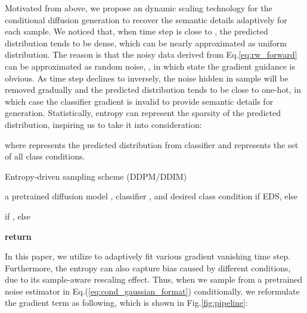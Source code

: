 \documentclass[runningheads]{llncs}
\begin{document}
Motivated from above, we propose an dynamic scaling technology for the conditional diffusion generation to recover the semantic details adaptively for each sample.
We noticed that, when time step is close to , the predicted distribution tends to be dense, which can be nearly approximated as uniform distribution.
The reason is that the noisy data derived from Eq.\eqref{eq:rw_forward} can be approximated as random noise, ,
in which state the gradient guidance is obvious.
As time step declines to  inversely, the noise hidden in sample will be removed gradually and the predicted distribution tends to be close to one-hot, in which case the classifier gradient is invalid to provide semantic details for generation.
Statistically, entropy can represent the sparsity of the predicted distribution, inspiring us to take it into consideration:

where  represents the predicted distribution from classifier and  represents the set of all class conditions.





\begin{algorithm}[t]
    \caption{ \small{Entropy-driven sampling scheme (DDPM/DDIM)}}
    \label{alg:entropy_driven_ddpm}
        
    \begin{algorithmic}[1]
        \Require a pretrained diffusion model , classifier , and desired class condition 
        \State 
        \For{}
            \State  if EDS, else 
    
                \State  if , else 
                
                \State 
                
                \State 
                \State 
                
                \State 
            \EndIf
        \EndFor
        \State \textbf{return} 
        
\end{algorithmic}
    
  
\end{algorithm}









 
In this paper, we utilize  to adaptively fit various gradient vanishing time step.
Furthermore, the entropy  can also capture bias caused by different conditions, due to its sample-aware rescaling effect.
Thus, when we sample from a pretrained noise estimator  in Eq.(\eqref{eq:cond_gaussian_format}) conditionally, 
we reformulate the gradient term  as following, which is shown in Fig.\ref{fig:pipeline}:
\end{document}
